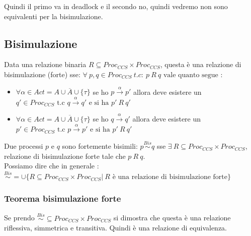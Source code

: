\begin{center}
\end{center}
Quindi il primo va in deadlock e il secondo no, quindi vedremo non sono
equivalenti per la bisimulazione.
  

\subsection{Bisimulazione}
Data una relazione binaria $R\subseteq Proc_{CCS}\times Proc_{CCS}$, questa è una relazione di bisimulazione (forte) sse: $\forall \ p,q\in Proc_{CCS} \ t.c: \ p \ R \ q \mbox{ vale quanto segue }$: 
\begin{itemize} 
    \item $\forall \alpha\in Act=A\cup \overline{A} \cup \{\tau\}$ se ho $p\stackrel{\alpha}{\rightarrow}p'$ allora deve esistere un $ q'\in  Proc_{CCS} \mbox{ t.c }q\stackrel{\alpha}{\rightarrow}q'\mbox{ e si ha }p'\ R\ q'$ 
    \item  $\forall \alpha\in Act=A\cup \overline{A}\cup \{\tau\}$ se ho $q\stackrel{\alpha}{\rightarrow}q'$ allora deve esistere un $ p' \in  Proc_{CCS}\mbox{ t.c }p\stackrel{\alpha}{\rightarrow}p'\mbox{ e si ha }p'\ R\ q'$ 
\end{itemize} 
Due processi $p$ e $q$ sono fortemente bisimili: $p\stackrel{Bis}{\sim} q$ sse $\exists \ R\subseteq Proc_{CCS}\times Proc_{CCS}$, relazione di bisimulazione forte tale che $p \ R\ q$.\\ 

Possiamo dire che in generale : $\stackrel{Bis}{\sim}=\cup\{R\subseteq Proc_{CCS}\times Proc_{CCS} | \ R \mbox{ è una relazione di bisimulazione forte}\}$

\subsubsection{Teorema bisimulazione forte}
Se prendo $\stackrel{Bis}{\sim}\subseteq Proc_{CCS}\times Proc_{CCS}$ si dimostra che questa è una relazione riflessiva, simmetrica e transitiva. Quindi è una relazione di equivalenza.\\ 

